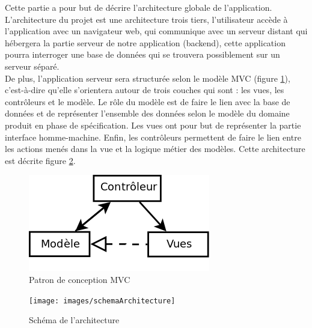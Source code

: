 Cette partie a pour but de décrire l'architecture globale de l'application.\\

L'architecture du projet est une architecture trois tiers, l'utilisateur accède à l'application avec un navigateur web, qui communique avec un serveur distant qui hébergera la partie serveur de notre application (backend), cette application pourra interroger une base de données qui se trouvera possiblement sur un serveur séparé.\\

De plus, l'application serveur sera structurée selon le modèle MVC (figure \ref{MVC}), c'est-à-dire qu'elle s'orientera autour de trois couches qui sont : les vues, les contrôleurs et le modèle. Le rôle du modèle est de faire le lien avec la base de données et de représenter l'ensemble des données selon le modèle du domaine produit en phase de spécification. Les vues ont pour but de représenter la partie interface homme-machine. Enfin, les contrôleurs permettent de faire le lien entre les actions menés dans la vue et la logique métier des modèles. Cette architecture est décrite figure \ref{archi_schema}. \\


\begin{figure}[!h]
	\begin{center}
	\includegraphics[scale=0.5]{images/MVC}
	\caption{\label{MVC} Patron de conception MVC}
	\end{center}
\end{figure}

\begin{figure}[!h]
	\begin{center}
	\texttt{[image: images/schemaArchitecture]}
	\caption{\label{archi_schema} Schéma de l'architecture}
	\end{center}
\end{figure}